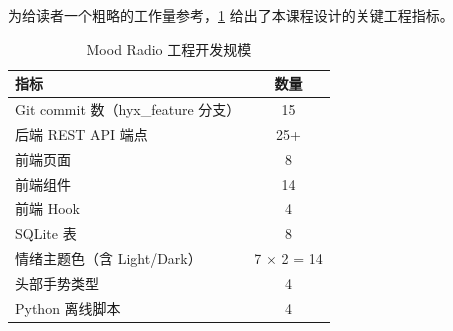 \label{sec:appendix-scale}

为给读者一个粗略的工作量参考，\cref{tab:scale} 给出了本课程设计的关键工程指标。

\begin{table}[!htb]
  \centering
  \caption{Mood Radio 工程开发规模}\label{tab:scale}
  \begin{tabular*}{\linewidth}{@{\extracolsep{\fill}}lc}
    \toprule
    \textbf{指标} & \textbf{数量} \\
    \midrule
    Git commit 数（hyx\_feature 分支） & 15 \\
    后端 REST API 端点                 & 25+ \\
    前端页面                           & 8 \\
    前端组件                           & 14 \\
    前端 Hook                          & 4 \\
    SQLite 表                          & 8 \\
    情绪主题色（含 Light/Dark）        & 7 $\times$ 2 = 14 \\
    头部手势类型                       & 4 \\
    Python 离线脚本                    & 4 \\
    \bottomrule
  \end{tabular*}
\end{table}

